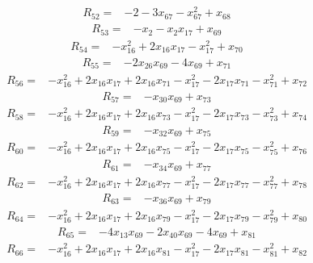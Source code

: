 \[\begin{aligned}R_{52}={}&-2-3x_{67}-x_{67}^{2}+x_{68}
\end{aligned}\]
\[\begin{aligned}R_{53}={}&-x_{2}-x_{2}x_{17}+x_{69}
\end{aligned}\]
\[\begin{aligned}R_{54}={}&-x_{16}^{2}+2x_{16}x_{17}-x_{17}^{2}+x_{70}
\end{aligned}\]
\[\begin{aligned}R_{55}={}&-2x_{26}x_{69}-4x_{69}+x_{71}
\end{aligned}\]
\[\begin{aligned}R_{56}={}&-x_{16}^{2}+2x_{16}x_{17}+2x_{16}x_{71}-x_{17}^{2}-2x_{17}x_{71}-x_{71}^{2}+x_{72}
\end{aligned}\]
\[\begin{aligned}R_{57}={}&-x_{30}x_{69}+x_{73}
\end{aligned}\]
\[\begin{aligned}R_{58}={}&-x_{16}^{2}+2x_{16}x_{17}+2x_{16}x_{73}-x_{17}^{2}-2x_{17}x_{73}-x_{73}^{2}+x_{74}
\end{aligned}\]
\[\begin{aligned}R_{59}={}&-x_{32}x_{69}+x_{75}
\end{aligned}\]
\[\begin{aligned}R_{60}={}&-x_{16}^{2}+2x_{16}x_{17}+2x_{16}x_{75}-x_{17}^{2}-2x_{17}x_{75}-x_{75}^{2}+x_{76}
\end{aligned}\]
\[\begin{aligned}R_{61}={}&-x_{34}x_{69}+x_{77}
\end{aligned}\]
\[\begin{aligned}R_{62}={}&-x_{16}^{2}+2x_{16}x_{17}+2x_{16}x_{77}-x_{17}^{2}-2x_{17}x_{77}-x_{77}^{2}+x_{78}
\end{aligned}\]
\[\begin{aligned}R_{63}={}&-x_{36}x_{69}+x_{79}
\end{aligned}\]
\[\begin{aligned}R_{64}={}&-x_{16}^{2}+2x_{16}x_{17}+2x_{16}x_{79}-x_{17}^{2}-2x_{17}x_{79}-x_{79}^{2}+x_{80}
\end{aligned}\]
\[\begin{aligned}R_{65}={}&-4x_{13}x_{69}-2x_{40}x_{69}-4x_{69}+x_{81}
\end{aligned}\]
\[\begin{aligned}R_{66}={}&-x_{16}^{2}+2x_{16}x_{17}+2x_{16}x_{81}-x_{17}^{2}-2x_{17}x_{81}-x_{81}^{2}+x_{82}
\end{aligned}\]
